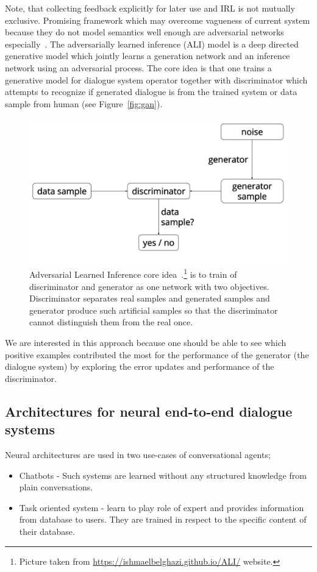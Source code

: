 \documentclass[11pt]{article}
\begin{document}
Note, that collecting feedback explicitly for later use and IRL is not mutually exclusive.
Promising framework which may overcome vagueness of current system because they do not model semantics well enough are adversarial networks especially~\cite{dumoulin_adversarially_2016}.
The adversarially learned inference (ALI) model is a deep directed generative model which jointly learns a generation network and an inference network using an adversarial process. 
The core idea is that one trains a generative model for dialogue system operator together with discriminator which attempts to recognize if generated dialogue is from the trained system or data sample from human (see Figure~\ref{fig:gan}).

\begin{figure}[htpb]
    \centering
    \includegraphics[width=0.8\linewidth]{gan_simple}
    \caption{Adversarial Learned Inference core idea~\cite{dumoulin_adversarially_2016}.\footnote{Picture taken from \url{https://ishmaelbelghazi.github.io/ALI/} website.} is to train of discriminator and generator as one network with two objectives. Discriminator separates real samples and generated samples and generator produce such artificial samples so that the discriminator cannot distinguish them from the real once.}
    \label{fig:name}
\end{figure}

We are interested in this approach because one should be able to see which positive examples contributed the most for the performance of the generator (the dialogue system) by exploring the error updates and performance of the discriminator.


\subsection{Architectures for neural end-to-end dialogue systems}
\label{sub:nn_architectures}
Neural architectures are used in two use-cases of conversational agents;
\begin{itemize}
    \item Chatbots - Such systems are learned without any structured knowledge from plain conversations.
    \item Task oriented system - learn to play role of expert and provides information from database to users.
        They are trained in respect to the specific content of their database.
\end{itemize}
\end{document}
